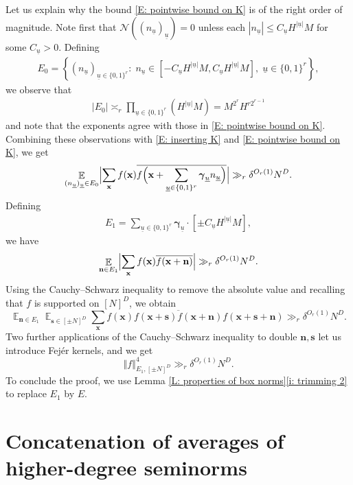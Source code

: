 \documentclass[11pt]{amsart}
\theoremstyle{definition}
\DeclareMathOperator*{\E}{\mathbb{E}}
\newcommand{\CN}{{\mathcal N}}
\newcommand{\bn}{{\mathbf{n}}}
\newcommand{\bx}{{\mathbf{x}}}
\newcommand{\bs}{{\mathbf{s}}}
\newcommand{\bgamma}{{\boldsymbol{\gamma}}}
\newcommand{\uu}{{\underline{u}}}
\newcommand{\norm}[1]{\left\Vert #1\right\Vert}
\newcommand{\Bigabs}[1]{\Bigl| #1 \Bigr|}
\newcommand{\brac}[1]{\mathopen{}\left( #1 \mathclose{}\right)}
\newcommand{\Bigbrac}[1]{\Bigl( #1 \Bigr)}
\begin{document}
Let us explain why the bound \eqref{E: pointwise bound on K} is of the right order of magnitude.  Note first that $\CN((n_\uu)_\uu) = 0$ unless each $|n_\uu|\leq C_\uu H^{|\uu|} M$ for some $C_\uu>0$. Defining
    \begin{align*}
        E_0 = \left\{(n_\uu)_{\uu\in\{0,1\}^{r}}:\; n_\uu \in [-C_\uu H^{|\uu|}M, C_\uu H^{|\uu|}M],\; \uu\in\{0,1\}^{r} \right\},
    \end{align*}
we observe that
\begin{align*}
    |E_0|\asymp_{r} \prod_{\uu\in\{0,1\}^r} (H^{|\uu|}M) = M^{2^r} H^{r 2^{r-1}}
\end{align*}
and note that the exponents agree with those in \eqref{E: pointwise bound on K}. Combining these observations with \eqref{E: inserting K} and \eqref{E: pointwise bound on K}, we get
\begin{align*}
    \E_{(n_\uu)_\uu\in E_0}\Bigabs{\sum_\bx f(\bx) \overline{f\Bigbrac{\bx + \sum_{\uu\in\{0,1\}^{r}}\bgamma_\uu n_\uu}}} \gg_r \delta^{O_r(1)} N^D.
\end{align*}
Defining
    \begin{align*}
        E_1 =
        \sum_{\uu\in\{0,1\}^{r}}\bgamma_\uu\cdot[\pm C_\uu H^{|\uu|}M],
    \end{align*}
we have
\begin{align*}
    \E_{\bn\in E_1}\Bigabs{\sum_\bx f(\bx) \overline{f\brac{\bx + \bn}}} \gg_r \delta^{O_r(1)} N^D.
\end{align*}
Using the Cauchy--Schwarz inequality to remove the absolute value and recalling that $f$ is supported on $[N]^D$, we obtain
$$\E_{\bn\in E_1} \E_{\bs \in [\pm N]^D}\sum_\bx f(\bx) \overline{f(\bx+\bs)f(\bx+\bn)}f(\bx+\bs+\bn) \gg_r \delta^{O_r(1)} N^D.$$
Two further applications of the Cauchy--Schwarz inequality to double $\bn,\bs$ let us introduce Fej\'er kernels, and we get
$$\norm{f}^4_{E_1, [\pm N]^D} \gg_r \delta^{O_r(1)} N^D.$$
To conclude the proof, we use Lemma \ref{L: properties of box norms}\eqref{i: trimming 2} to replace $E_1$ by $E$.





\section{Concatenation of averages of higher-degree seminorms}\label{S: general concatenation}
\end{document}
